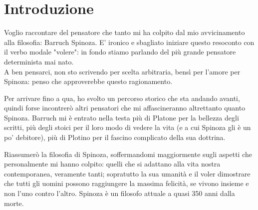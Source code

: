 
\chapter*{Introduzione}

Voglio raccontare del pensatore che tanto mi ha colpito dal mio avvicinamento alla filosofia: Barruch Spinoza. E' ironico e sbagliato iniziare questo resoconto con il verbo modale "volere": in fondo stiamo parlando del più grande pensatore determinista mai nato.\\
A ben pensarci, non sto scrivendo per scelta arbitraria, bensì per l'amore per Spinoza: penso che approverebbe questo ragionamento.

Per arrivare fino a qua, ho svolto un percorso storico che sta andando avanti, quindi forse incontrerò  altri pensatori che mi affascineranno altrettanto quanto Spinoza. Barruch mi è entrato nella testa più di Platone per la bellezza degli scritti, più degli stoici per il loro modo di vedere la vita (e a cui Spinoza gli è un po' debitore), più di Plotino per il fascino complicato della sua dottrina.

Riassumerò la filosofia di Spinoza, soffermandomi maggiormente sugli aspetti che  personalmente mi hanno colpito: quelli che si adattano alla vita nostra contemporanea, veramente tanti; sopratutto la sua umanità e il voler dimostrare che tutti gli uomini possono raggiungere la massima felicità, se vivono insieme e non l'uno contro l'altro. Spinoza è un filosofo attuale a quasi 350 anni dalla morte.
\newpage